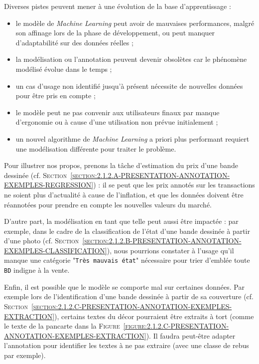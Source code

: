 			Diverses pistes peuvent mener à une évolution de la base d'apprentissage :
			\begin{itemize}
				\item le modèle de \textit{Machine Learning} peut avoir de mauvaises performances, malgré son affinage lors de la phase de développement, ou peut manquer d'adaptabilité sur des données réelles ;
				\item la modélisation ou l'annotation peuvent devenir obsolètes car le phénomène modélisé évolue dans le temps ;
				\item un cas d'usage non identifié jusqu'à présent nécessite de nouvelles données pour être pris en compte ;
				\item le modèle peut ne pas convenir aux utilisateurs finaux par manque d'ergonomie ou à cause d'une utilisation non prévue initialement ;
				\item un nouvel algorithme de \textit{Machine Learning} a priori plus performant requiert une modélisation différente pour traiter le problème.
			\end{itemize}
			\begin{leftBarExamples}
				Pour illustrer nos propos, prenons la tâche d'estimation du prix d'une bande dessinée (cf. \textsc{Section~\ref{section:2.1.2.A-PRESENTATION-ANNOTATION-EXEMPLES-REGRESSION}}) : il se peut que les prix annotés sur les transactions ne soient plus d'actualité à cause de l'inflation, et que les données doivent être réannotées pour prendre en compte les nouvelles valeurs du marché.
				
				D'autre part, la modélisation en tant que telle peut aussi être impactée : par exemple, dans le cadre de la classification de l'état d'une bande dessinée à partir d'une photo (cf. \textsc{Section~\ref{section:2.1.2.B-PRESENTATION-ANNOTATION-EXEMPLES-CLASSIFICATION}}), nous pourrions constater à l'usage qu'il manque une catégorie "\texttt{Très mauvais état}" nécessaire pour trier d'emblée toute \texttt{BD} indigne à la vente.
				
				Enfin, il est possible que le modèle se comporte mal sur certaines données.
				Par exemple lors de l'identification d'une bande dessinée à partir de sa couverture (cf. \textsc{Section~\ref{section:2.1.2.C-PRESENTATION-ANNOTATION-EXEMPLES-EXTRACTION}}), certains textes du décor pourraient être extraits à tort (comme le texte de la pancarte  dans la \textsc{Figure~\ref{figure:2.1.2.C-PRESENTATION-ANNOTATION-EXEMPLES-EXTRACTION}}).
				Il faudra peut-être adapter l'annotation pour identifier les textes à ne pas extraire (avec une classe de rebus par exemple).
			\end{leftBarExamples}
			
